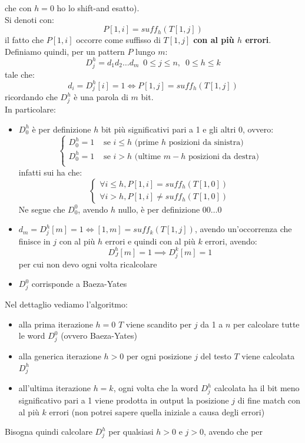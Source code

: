 \documentclass[a4paper,12pt, oneside]{book}
\begin{document}
che con $h=0$ ho lo shift-and esatto).\\
Si denoti con:
\[P[1,i]=suff_h(T[1,j])\]
il fatto che $P[1,i]$ occorre come suffisso di $T[1,j]$ \textbf{con al più $h$
  errori}. \\
Definiamo quindi, per un pattern $P$ lungo $m$:
\[D_j^h=d_1d_2\ldots d_m\,\,\,0\leq j\leq n,\,\,\, 0\leq h\leq k\]
tale che:
\[d_i=D_j^h[i]=1\iff P[1,j]=suff_h(T[1,j])\]
ricordando che $D_j^h$ è una parola di $m$ bit.\\
In particolare:
\begin{itemize}
  \item $D_0^h$ è per definizione $h$ bit più significativi pari a 1 e gli altri
  0, ovvero:
  \[
    \begin{cases}
      D_0^h=1&\mbox{ se } i\leq h \mbox{ (prime $h$ posizioni da sinistra)}\\
      D_0^h=1&\mbox{ se } i> h\mbox{ (ultime $m-h$ posizioni da destra)}\\
    \end{cases}
  \]
  infatti sui ha che:
  \[
    \begin{cases}
      \forall i\leq h, P[1,i]=suff_h(T[1,0])\\
      \forall i>h, P[1,i]\neq suff_h(T[1,0])
    \end{cases}
  \]
  Ne segue che $D_0^0$, avendo $h$ nullo, è per definizione $00\ldots 0$
  \item $d_m=D_j^h[m]=1\iff [1,m] = suff_k(T[1,j])$, avendo un'occorrenza che
  finisce in $j$ con al più $h$ errori e quindi con al più $k$ errori, avendo:
  \[D_J^h[m]=1\implies D_j^k[m]=1\]
  per cui non devo ogni volta ricalcolare
  \item $D_j^0$ corrisponde a Baeza-Yates
\end{itemize}
Nel dettaglio vediamo l'algoritmo:
\begin{itemize}
  \item alla prima iterazione $h=0$ $T$ viene scandito per $j$ da 1 a $n$ per
  calcolare tutte le word $D_j^0$ (ovvero Baeza-Yates)
  \item alla generica iterazione $h>0$ per ogni posizione $j$ del testo $T$
  viene calcolata $D_j^h$
  \item all'ultima iterazione $h=k$, ogni volta che la word $D_j^h$ calcolata ha
  il bit meno significativo pari a 1 viene prodotta in output la posizione $j$ di
  fine match con al più $k$ errori (non potrei sapere quella iniziale a causa
  degli errori) 
\end{itemize}
Bisogna quindi calcolare $D_j^h$ per qualsiasi $h>0$ e $j>0$, avendo che per
\end{document}
